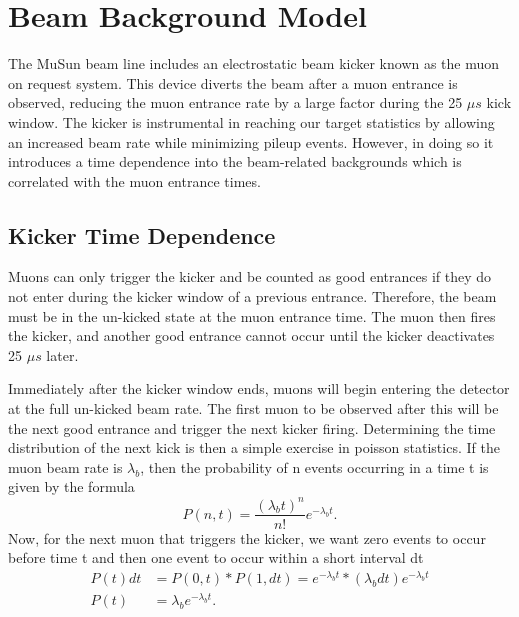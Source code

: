 \chapter{Beam Background Model} \label{ch:beam_bg}

The MuSun beam line includes an electrostatic beam kicker known as the muon on request system.
This device diverts the beam after a muon entrance is observed, reducing the muon entrance rate by a large factor during the 25 $\mu s$ kick window.  
The kicker is instrumental in reaching our target statistics by allowing an increased beam rate while minimizing pileup events.
However, in doing so it introduces a time dependence into the beam-related backgrounds which is correlated with the muon entrance times.

\section{Kicker Time Dependence}

Muons can only trigger the kicker and be counted as good entrances if they do not enter during the kicker window of a previous entrance.
Therefore, the beam must be in the un-kicked state at the muon entrance time.  
The muon then fires the kicker, and another good entrance cannot occur until the kicker deactivates 25 $\mu s$ later.

Immediately after the kicker window ends, muons will begin entering the detector at the full un-kicked beam rate.  
The first muon to be observed after this will be the next good entrance and trigger the next kicker firing.
Determining the time distribution of the next kick is then a simple exercise in poisson statistics.
If the muon beam rate is $\lambda_b$, then the probability of n events occurring in a time t is given by the formula
\begin{equation}
P(n,t) = \frac{(\lambda_b t)^n}{n!} e^{-\lambda_b t}.
\end{equation}
Now, for the next muon that triggers the kicker, we want zero events to occur before time t and then one event to occur within a short interval dt
\begin{align}
P(t) dt & = P(0,t) * P(1,dt) = e^{-\lambda_b t} * (\lambda_b dt) e^{-\lambda_b t} \\
P(t) & = \lambda_b e^{-\lambda_b t}.
\end{align}

